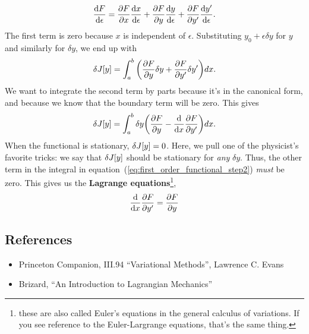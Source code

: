 \begin{equation}
  \label{eq:chain_rule}
  \dv{F}{\epsilon} = \pdv{F}{x} \dv{x}{\epsilon} + \pdv{F}{y} \dv{y}{\epsilon} + \pdv{F}{y'} \dv{y'}{\epsilon}.
\end{equation}
The first term is zero because $x$ is independent of $\epsilon$. Substituting $y_0 + \epsilon \delta y$ for $y$ and similarly for $\delta y$, we end up with
\begin{equation}
  \label{eq:first_order_functional_step2}
    \var{J[y]} = \int_a^b \qty(\pdv{F}{y} \delta y + \pdv{F}{y'} \delta y') dx.
\end{equation}
We want to integrate the second term by parts because it's in the canonical form, and because we know that the boundary term will be zero. This gives 
\begin{equation}
  \label{eq:first_order_functional_step2}
    \var{J[y]} = \int_a^b \delta y \qty(\pdv{F}{y} - \dv{x} \pdv{F}{y'}) dx.
\end{equation}
When the functional is stationary, $\var{J[y]} = 0$. Here, we pull one of the physicist's favorite tricks: we say that $\var{J[y]}$ should be stationary for \emph{any} $\delta y$. Thus, the other term in the integral in equation~(\ref{eq:first_order_functional_step2}) \emph{must} be zero. This gives us the \textbf{Lagrange equations}\footnote{these are also called Euler's equations in the general calculus of variations. If you see reference to the Euler-Largrange equations, that's the same thing.},
\begin{equation}
  \label{eq:1}
  \dv{x} \pdv{F}{y'} = \pdv{F}{y}
\end{equation}

\subsection{References}
\begin{itemize}
\item Princeton Companion, III.94 ``Variational Methods'', Lawrence C. Evans
\item Brizard, ``An Introduction to Lagrangian Mechanics''
\end{itemize}


